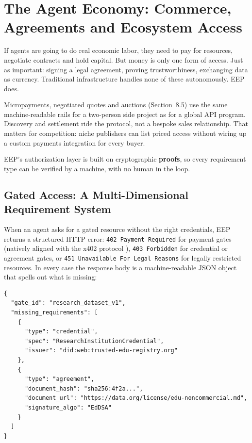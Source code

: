 \documentclass[12pt,a4paper]{article}
\begin{document}
\section{The Agent Economy: Commerce, Agreements and Ecosystem Access}

If agents are going to do real economic labor, they need to pay for resources, negotiate contracts and hold capital. But money is only one form of access. Just as important: signing a legal agreement, proving trustworthiness, exchanging data as currency. Traditional infrastructure handles none of these autonomously. EEP does.

Micropayments, negotiated quotes and auctions (Section~8.5) use the same machine-readable rails for a two-person side project as for a global API program. Discovery and settlement ride the protocol, not a bespoke sales relationship. That matters for competition: niche publishers can list priced access without wiring up a custom payments integration for every buyer.

EEP's authorization layer is built on cryptographic \textbf{proofs}, so every requirement type can be verified by a machine, with no human in the loop.

\subsection{Gated Access: A Multi-Dimensional Requirement System}

When an agent asks for a gated resource without the right credentials, EEP returns a structured HTTP error: \texttt{402 Payment Required} for payment gates (natively aligned with the x402 protocol \cite{ref27}), \texttt{403 Forbidden} for credential or agreement gates, or \texttt{451 Unavailable For Legal Reasons} for legally restricted resources. In every case the response body is a machine-readable JSON object that spells out what is missing:

\begin{lstlisting}[language=EEPJson,style=eepcode]
{
  "gate_id": "research_dataset_v1",
  "missing_requirements": [
    {
      "type": "credential",
      "spec": "ResearchInstitutionCredential",
      "issuer": "did:web:trusted-edu-registry.org"
    },
    {
      "type": "agreement",
      "document_hash": "sha256:4f2a...",
      "document_url": "https://data.org/license/edu-noncommercial.md",
      "signature_algo": "EdDSA"
    }
  ]
}
\end{lstlisting}
\end{document}
